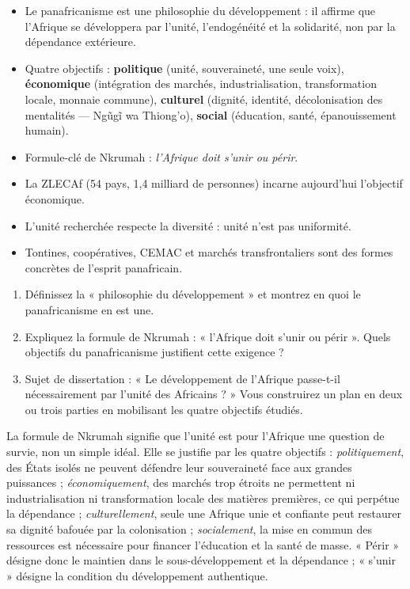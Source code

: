 \documentclass[11pt]{article}
\newcommand{\cle}[1]{{\popxbold\color{popdark}#1}}
\begin{document}
\begin{aretenir}
\begin{itemize}
\item Le panafricanisme est une \cle{philosophie du développement} : il affirme que l'Afrique se développera par l'unité, l'endogénéité et la solidarité, non par la dépendance extérieure.
\item Quatre objectifs : \textbf{politique} (unité, souveraineté, une seule voix), \textbf{économique} (intégration des marchés, industrialisation, transformation locale, monnaie commune), \textbf{culturel} (dignité, identité, décolonisation des mentalités — Ngũgĩ wa Thiong'o), \textbf{social} (éducation, santé, épanouissement humain).
\item Formule-clé de Nkrumah : \emph{l'Afrique doit s'unir ou périr}.
\item La ZLECAf (54 pays, 1,4 milliard de personnes) incarne aujourd'hui l'objectif économique.
\item L'unité recherchée respecte la diversité : unité n'est pas uniformité.
\item Tontines, coopératives, CEMAC et marchés transfrontaliers sont des formes concrètes de l'esprit panafricain.
\end{itemize}
\end{aretenir}

\begin{exercice}
\begin{enumerate}
\item Définissez la « philosophie du développement » et montrez en quoi le panafricanisme en est une.
\item Expliquez la formule de Nkrumah : « l'Afrique doit s'unir ou périr ». Quels objectifs du panafricanisme justifient cette exigence ?
\item Sujet de dissertation : « Le développement de l'Afrique passe-t-il nécessairement par l'unité des Africains ? » Vous construirez un plan en deux ou trois parties en mobilisant les quatre objectifs étudiés.
\end{enumerate}
\end{exercice}

\begin{corrige}[Exercice n° 2]
La formule de Nkrumah signifie que l'unité est pour l'Afrique une question de survie, non un simple idéal. Elle se justifie par les quatre objectifs : \emph{politiquement}, des États isolés ne peuvent défendre leur souveraineté face aux grandes puissances ; \emph{économiquement}, des marchés trop étroits ne permettent ni industrialisation ni transformation locale des matières premières, ce qui perpétue la dépendance ; \emph{culturellement}, seule une Afrique unie et confiante peut restaurer sa dignité bafouée par la colonisation ; \emph{socialement}, la mise en commun des ressources est nécessaire pour financer l'éducation et la santé de masse. « Périr » désigne donc le maintien dans le sous-développement et la dépendance ; « s'unir » désigne la condition du développement authentique.
\end{corrige}
\end{document}
